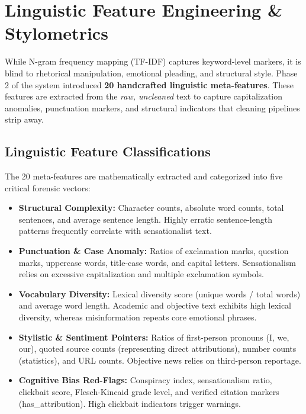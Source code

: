 \documentclass[11pt,a4paper,oneside]{article}
\begin{document}
\newpage
\section{Linguistic Feature Engineering \& Stylometrics}
\label{sec:features}

While N-gram frequency mapping (TF-IDF) captures keyword-level markers, it is blind to rhetorical manipulation, emotional pleading, and structural style. Phase 2 of the system introduced \textbf{20 handcrafted linguistic meta-features}. These features are extracted from the \textit{raw, uncleaned} text to capture capitalization anomalies, punctuation markers, and structural indicators that cleaning pipelines strip away.

\subsection{Linguistic Feature Classifications}
The 20 meta-features are mathematically extracted and categorized into five critical forensic vectors:
\begin{itemize}
    \item \textbf{Structural Complexity:} Character counts, absolute word counts, total sentences, and average sentence length. Highly erratic sentence-length patterns frequently correlate with sensationalist text.
    \item \textbf{Punctuation \& Case Anomaly:} Ratios of exclamation marks, question marks, uppercase words, title-case words, and capital letters. Sensationalism relies on excessive capitalization and multiple exclamation symbols.
    \item \textbf{Vocabulary Diversity:} Lexical diversity score (unique words / total words) and average word length. Academic and objective text exhibits high lexical diversity, whereas misinformation repeats core emotional phrases.
    \item \textbf{Stylistic & Sentiment Pointers:} Ratios of first-person pronouns (I, we, our), quoted source counts (representing direct attributions), number counts (statistics), and URL counts. Objective news relies on third-person reportage.
    \item \textbf{Cognitive Bias Red-Flags:} Conspiracy index, sensationalism ratio, clickbait score, Flesch-Kincaid grade level, and verified citation markers (has\_attribution). High clickbait indicators trigger warnings.
\end{itemize}
\end{document}
